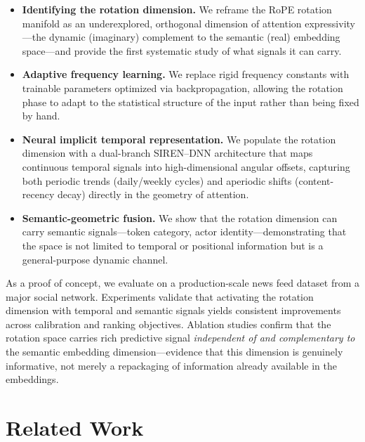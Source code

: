 \documentclass{article}
\begin{document}
\begin{itemize}
  \item \textbf{Identifying the rotation dimension.} We reframe the RoPE rotation manifold as an underexplored, orthogonal dimension of attention expressivity---the dynamic (imaginary) complement to the semantic (real) embedding space---and provide the first systematic study of what signals it can carry.
  \item \textbf{Adaptive frequency learning.} We replace rigid frequency constants with trainable parameters optimized via backpropagation, allowing the rotation phase to adapt to the statistical structure of the input rather than being fixed by hand.
  \item \textbf{Neural implicit temporal representation.} We populate the rotation dimension with a dual-branch SIREN--DNN architecture that maps continuous temporal signals into high-dimensional angular offsets, capturing both periodic trends (daily/weekly cycles) and aperiodic shifts (content-recency decay) directly in the geometry of attention.
  \item \textbf{Semantic-geometric fusion.} We show that the rotation dimension can carry semantic signals---token category, actor identity---demonstrating that the space is not limited to temporal or positional information but is a general-purpose dynamic channel.
\end{itemize}

As a proof of concept, we evaluate on a production-scale news feed dataset from a major social network. Experiments validate that activating the rotation dimension with temporal and semantic signals yields consistent improvements across calibration and ranking objectives. Ablation studies confirm that the rotation space carries rich predictive signal \emph{independent of and complementary to} the semantic embedding dimension---evidence that this dimension is genuinely informative, not merely a repackaging of information already available in the embeddings.

\section{Related Work}
\end{document}
